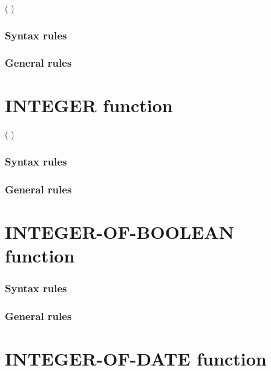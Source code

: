 \begin{syntax}
    ( \argument )
\end{syntax}

\subsubsection{Syntax rules}

\subsubsection{General rules}

\section{INTEGER function}

\begin{syntax}
    ( \argument )
\end{syntax}

\subsubsection{Syntax rules}

\subsubsection{General rules}

\section{INTEGER-OF-BOOLEAN function}

\begin{syntax}
\end{syntax}

\subsubsection{Syntax rules}

\subsubsection{General rules}

\section{INTEGER-OF-DATE function}

